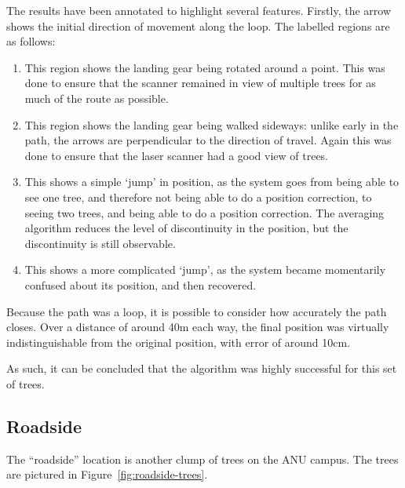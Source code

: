 \documentclass[12pt,oneside,a4paper]{book}
\begin{document}
The results have been annotated to highlight several
features. Firstly, the arrow shows the initial direction of movement
along the loop. The labelled regions are as follows:
\begin{enumerate}[A:]
\item This region shows the landing gear being rotated around a
  point. This was done to ensure that the scanner remained in view of
  multiple trees for as much of the route as possible.
\item This region shows the landing gear being walked sideways: unlike
  early in the path, the arrows are perpendicular to the direction of
  travel. Again this was done to ensure that the laser scanner had a
  good view of trees.
\item This shows a simple `jump' in position, as the system goes from
  being able to see one tree, and therefore not being able to do a
  position correction, to seeing two trees, and being able to do a
  position correction. The averaging algorithm reduces the level of
  discontinuity in the position, but the discontinuity is still
  observable.
\item This shows a more complicated `jump', as the system became
  momentarily confused about its position, and then recovered.
\end{enumerate}

Because the path was a loop, it is possible to consider how accurately the path
closes. Over a distance of around 40m each way, the final position was
virtually indistinguishable from the original position, with error of
around 10cm.

As such, it can be concluded that the algorithm was highly successful for
this set of trees.

\subsection{Roadside}
\label{sec:roadside}

The ``roadside'' location is another clump of trees on the ANU
campus. The trees are pictured in Figure~\ref{fig:roadside-trees}.
\end{document}

